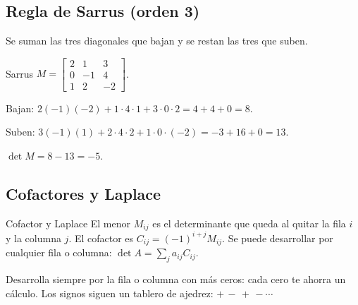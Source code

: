 \subsection{Regla de Sarrus (orden 3)}
Se suman las tres diagonales que bajan y se restan las tres que suben.

\begin{center}
\end{center}

\begin{tmejemplo}{Sarrus}
$M=\begin{bmatrix}2&1&3\\0&-1&4\\1&2&-2\end{bmatrix}$.
\begin{tmpasos}
\item Bajan: $2(-1)(-2)+1\cdot4\cdot1+3\cdot0\cdot2=4+4+0=8$.
\item Suben: $3(-1)(1)+2\cdot4\cdot2+1\cdot0\cdot(-2)=-3+16+0=13$.
\item $\det M=8-13=-5$.
\end{tmpasos}
\end{tmejemplo}

\subsection{Cofactores y Laplace}
\begin{tmdef}{Cofactor y Laplace}
El menor $M_{ij}$ es el determinante que queda al quitar la fila $i$ y la columna $j$. El cofactor es $C_{ij}=(-1)^{i+j}M_{ij}$. Se puede desarrollar por cualquier fila o columna: $\det A=\sum_j a_{ij}C_{ij}$.
\end{tmdef}

\begin{tmtip}Desarrolla siempre por la fila o columna con m\'as ceros: cada cero te ahorra un c\'alculo. Los signos siguen un tablero de ajedrez: $+\,-\,+\,-\cdots$\end{tmtip}

